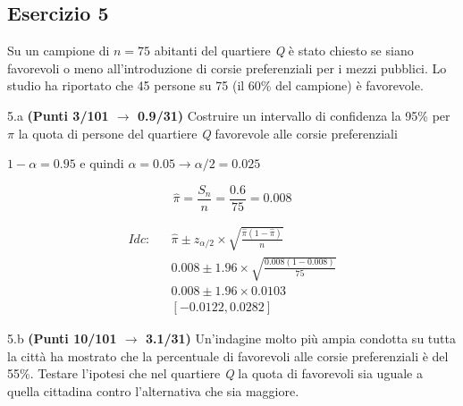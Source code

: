 \documentclass[
  11pt,
]{book}
\theoremstyle{mytheoremstyle}
\theoremstyle{mydefstyle}
\newenvironment{sol}
  {
  \begin{tcolorbox}[enhanced,breakable,arc=0.1mm,boxrule=1pt,colback=white,colframe=iblue,
  title=\bf \fontfamily{lmss}\selectfont \hspace{.5 cm} Soluzione,drop fuzzy shadow]

}{
\end{tcolorbox}
  }
\begin{document}
\subsection{Esercizio 5}\label{esercizio-5-12}

Su un campione di \(n=75\) abitanti del quartiere \emph{Q} è stato chiesto se siano favorevoli o meno all'introduzione di corsie preferenziali per i mezzi pubblici. Lo studio ha riportato che 45 persone su 75 (il 60\% del campione) è favorevole.

5.a \textbf{(Punti 3/101 \(\rightarrow\) 0.9/31)} Costruire un intervallo di confidenza la 95\% per \(\pi\) la quota di persone del quartiere \emph{Q} favorevole alle corsie preferenziali

\begin{sol}
\(1-\alpha =0.95\) e quindi \(\alpha=0.05\rightarrow \alpha/2=0.025\)

\[
  \hat\pi = \frac{S_n}n = \frac{ 0.6 }{ 75 }= 0.008 
\]

\begin{eqnarray*}
  Idc: & &  \hat\pi \pm  z_{\alpha/2} \times \sqrt{\frac{\hat\pi(1-\hat\pi)}{n}} \\
     & &  0.008 \pm  1.96 \times \sqrt{\frac{ 0.008 (1- 0.008 )}{ 75 }} \\
     & &  0.008 \pm  1.96 \times  0.0103 \\
     & & [ -0.0122 ,  0.0282 ]
\end{eqnarray*}

\end{sol}

5.b \textbf{(Punti 10/101 \(\rightarrow\) 3.1/31)} Un'indagine molto più ampia condotta su tutta la città ha mostrato che
la percentuale di favorevoli alle corsie preferenziali è del 55\%. Testare l'ipotesi che nel quartiere \emph{Q} la quota di favorevoli sia uguale a quella cittadina contro l'alternativa che sia maggiore.
\end{document}
